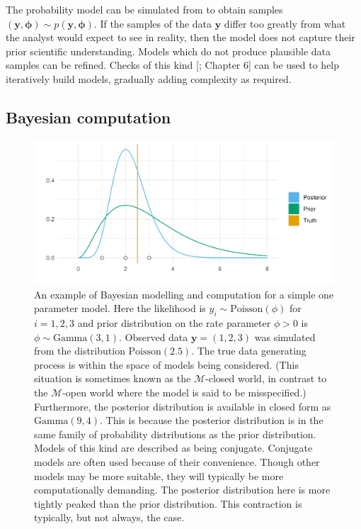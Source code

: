 \documentclass[a4paper, nobind]{templates/ociamthesis}
\begin{document}
The probability model can be simulated from to obtain samples \((\mathbf{y}, \boldsymbol{\mathbf{\phi}}) \sim p(\mathbf{y}, \boldsymbol{\mathbf{\phi}})\).
If the samples of the data \(\mathbf{y}\) differ too greatly from what the analyst would expect to see in reality, then the model does not capture their prior scientific understanding.
Models which do not produce plausible data samples can be refined.
Checks of this kind {[}\textcite{gelman2013bayesian}; Chapter 6{]} can be used to help iteratively build models, gradually adding complexity as required.

\hypertarget{bayesian-computation}{%
\subsection{Bayesian computation}\label{bayesian-computation}}



\begin{figure}
\includegraphics[width=0.95\linewidth]{figures/bayesian/conjugate} \caption{An example of Bayesian modelling and computation for a simple one parameter model. Here the likelihood is \(y_i \sim \text{Poisson}(\phi)\) for \(i = 1, 2, 3\) and prior distribution on the rate parameter \(\phi > 0\) is \(\phi \sim \text{Gamma}(3, 1)\). Observed data \(\mathbf{y} = (1, 2, 3)\) was simulated from the distribution \(\text{Poisson}(2.5)\). The true data generating process is within the space of models being considered. (This situation is sometimes known \autocite{bernardo2001bayesian} as the \(\mathcal{M}\)-closed world, in contrast to the \(\mathcal{M}\)-open world where the model is said to be misspecified.) Furthermore, the posterior distribution is available in closed form as \(\text{Gamma}(9, 4)\). This is because the posterior distribution is in the same family of probability distributions as the prior distribution. Models of this kind are described as being conjugate. Conjugate models are often used because of their convenience. Though other models may be more suitable, they will typically be more computationally demanding. The posterior distribution here is more tightly peaked than the prior distribution. This contraction is typically, but not always, the case.}\label{fig:conjugate}
\end{figure}
\end{document}
